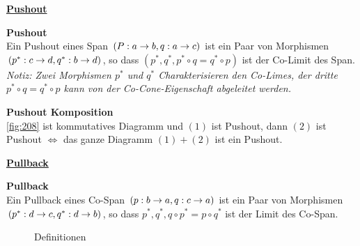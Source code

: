 \begin{multicols}{2}

\textbf{\underline{Pushout}} 

\textbf{ Pushout} \\
Ein Pushout eines Span $(P: a \rightarrow b, q: a \rightarrow c)$ ist ein Paar von Morphismen $(p^*: c \rightarrow d, q^*: b \rightarrow d)$, so dass $(p^*, q^*, p^* \circ q = q^* \circ p)$ ist der Co-Limit des Span. \\
\emph{Notiz: Zwei Morphismen $p^*$ und $q^*$ Charakterisieren den Co-Limes, der dritte $p^* \circ q = q^* \circ p$ kann von der Co-Cone-Eigenschaft abgeleitet werden.}

\textbf{ Pushout Komposition} \\
\ref{fig:208} ist kommutatives Diagramm und $(1)$ ist Pushout, dann $(2)$ ist Pushout $\Leftrightarrow$ das ganze Diagramm $(1)+(2)$ ist ein Pushout.




\columnbreak

\textbf{\underline{Pullback}} 

\textbf{ Pullback} \\
Ein Pullback eines Co-Span $(p: b \rightarrow a, q: c \rightarrow a)$ ist ein Paar von Morphismen $(p^*: d \rightarrow c, q^*: d \rightarrow b)$, so dass $p^*,q^*, q \circ p^* = p \circ q^*$ ist der Limit des Co-Span.

\end{multicols}

\begin{figure}[h]
\centering
{} \qquad \qquad \qquad
{}
\caption{Definitionen}
\end{figure}


